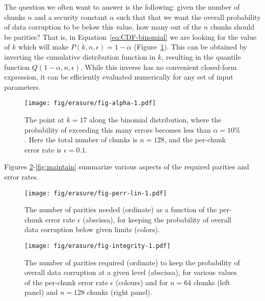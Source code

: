 The question we often want to answer is the following: given the number
of chunks \(n\) and a security constant \(\alpha\) such that that we want the
overall probability of data corruption to be below this value, how many
out of the \(n\) chunks should be parities? That is, in
Equation~\ref{eq:CDF-binomial} we are looking for the value of \(k\)
which will make \(P(k, n, \epsilon) = 1 - \alpha\)
(Figure~\ref{fig:alpha}). This can be obtained by inverting the
cumulative distribution function in \(k\), resulting in the quantile
function \(Q(1 - \alpha, n, \epsilon)\). While this inverse has no
convenient closed-form expression, it can be efficiently evaluated
numerically for any set of input parameters.

\begin{figure}[!ht]

{\centering \texttt{[image: fig/erasure/fig-alpha-1.pdf]}

}

\caption{\label{fig:alpha}The point at \(k=17\) along the binomial
distribution, where the probability of exceeding this many errors
becomes less than \(\alpha = 10\%\). Here the total number of chunks is
\(n = 128\), and the per-chunk error rate is \(\epsilon = 0.1\).}

\end{figure}
Figures \ref{fig:perr-lin}-\ref{fig:maintain} summarize various aspects
of the required parities and error rates.

\begin{figure}[!ht]

{\centering \texttt{[image: fig/erasure/fig-perr-lin-1.pdf]}

}

\caption{\label{fig:perr-lin}The number of parities needed (ordinate) as
a function of the per-chunk error rate \(\epsilon\) (abscissa), for
keeping the probability of overall data corruption below given limits
(colors).}

\end{figure}

\begin{figure}[!ht]

{\centering \texttt{[image: fig/erasure/fig-integrity-1.pdf]}

}

\caption{\label{fig:integrity}The number of parities required (ordinate)
to keep the probability of overall data corruption at a given level
(abscissa), for various values of the per-chunk error rate \(\epsilon\)
(colours) and for \(n = 64\) chunks (left panel) and \(n = 128\) chunks
(right panel).}

\end{figure}

